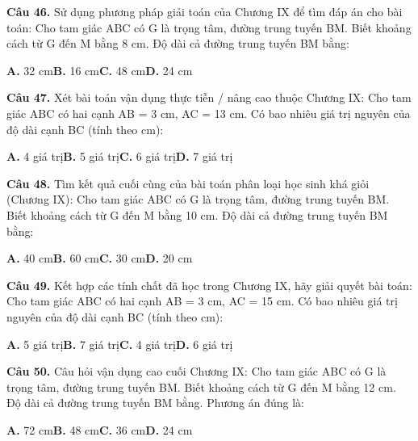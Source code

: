 \documentclass[11pt,a4paper]{article}
\begin{document}
\textbf{\color{primary} Câu 46.} Sử dụng phương pháp giải toán của Chương IX để tìm đáp án cho bài toán: Cho tam giác ABC có G là trọng tâm, đường trung tuyến BM. Biết khoảng cách từ G đến M bằng 8 cm. Độ dài cả đường trung tuyến BM bằng:\par
\hspace*{1.5em}\textbf{A.} 32 cm\quad\quad \textbf{B.} 16 cm\quad\quad \textbf{C.} 48 cm\quad\quad \textbf{D.} 24 cm\par\vspace{2pt}
\textbf{\color{primary} Câu 47.} Xét bài toán vận dụng thực tiễn / nâng cao thuộc Chương IX: Cho tam giác ABC có hai cạnh AB = 3 cm, AC = 13 cm. Có bao nhiêu giá trị nguyên của độ dài cạnh BC (tính theo cm):\par
\hspace*{1.5em}\textbf{A.} 4 giá trị\quad\quad \textbf{B.} 5 giá trị\quad\quad \textbf{C.} 6 giá trị\quad\quad \textbf{D.} 7 giá trị\par\vspace{2pt}
\textbf{\color{primary} Câu 48.} Tìm kết quả cuối cùng của bài toán phân loại học sinh khá giỏi (Chương IX): Cho tam giác ABC có G là trọng tâm, đường trung tuyến BM. Biết khoảng cách từ G đến M bằng 10 cm. Độ dài cả đường trung tuyến BM bằng:\par
\hspace*{1.5em}\textbf{A.} 40 cm\quad\quad \textbf{B.} 60 cm\quad\quad \textbf{C.} 30 cm\quad\quad \textbf{D.} 20 cm\par\vspace{2pt}
\textbf{\color{primary} Câu 49.} Kết hợp các tính chất đã học trong Chương IX, hãy giải quyết bài toán: Cho tam giác ABC có hai cạnh AB = 3 cm, AC = 15 cm. Có bao nhiêu giá trị nguyên của độ dài cạnh BC (tính theo cm):\par
\hspace*{1.5em}\textbf{A.} 5 giá trị\quad\quad \textbf{B.} 7 giá trị\quad\quad \textbf{C.} 4 giá trị\quad\quad \textbf{D.} 6 giá trị\par\vspace{2pt}
\textbf{\color{primary} Câu 50.} Câu hỏi vận dụng cao cuối Chương IX: Cho tam giác ABC có G là trọng tâm, đường trung tuyến BM. Biết khoảng cách từ G đến M bằng 12 cm. Độ dài cả đường trung tuyến BM bằng. Phương án đúng là:\par
\hspace*{1.5em}\textbf{A.} 72 cm\quad\quad \textbf{B.} 48 cm\quad\quad \textbf{C.} 36 cm\quad\quad \textbf{D.} 24 cm\par\vspace{2pt}
\end{document}
